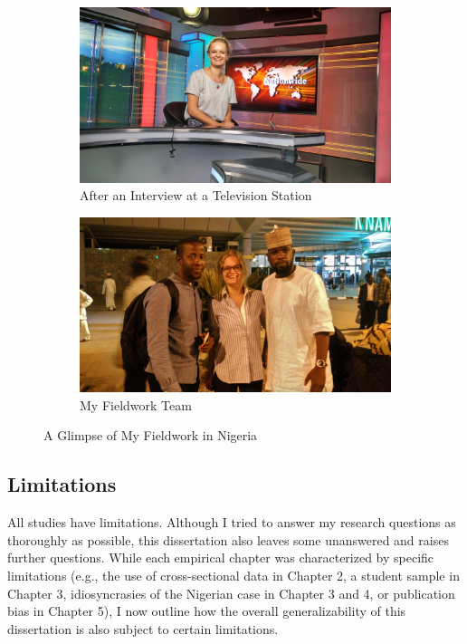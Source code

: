 \begin{figure}[H]
\bigskip
\begin{subfigure}{0.485\textwidth}
\includegraphics[width=\linewidth]{Chapter_6/conclusion-figure5.jpg}
\caption{After an Interview at a Television Station} \label{fig:c}
\end{subfigure}\hspace*{\fill}
\begin{subfigure}{0.485\textwidth}
\includegraphics[width=\linewidth]{Chapter_6/conclusion-figure4.jpg}
\caption{My Fieldwork Team} \label{fig:d}
\end{subfigure}

\caption{A Glimpse of My Fieldwork in Nigeria} \label{fig:1}
\end{figure}

\newpage
\subsection{Limitations}
\label{sec:621}
All studies have limitations. Although I tried to answer my research questions as thoroughly as possible, this dissertation also leaves some unanswered and raises further questions. While each empirical chapter was characterized by specific limitations (e.g., the use of cross-sectional data in Chapter 2, a student sample in Chapter 3, idiosyncrasies of the Nigerian case in Chapter 3 and 4, or publication bias in Chapter 5), I now outline how the overall generalizability of this dissertation is also subject to certain limitations.

